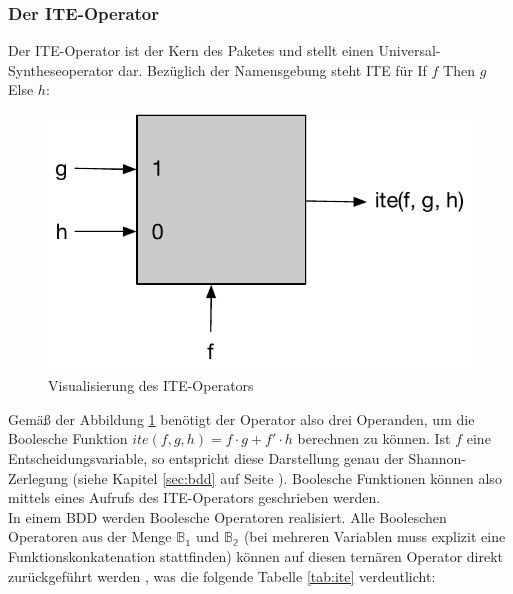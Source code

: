 \subsubsection{Der ITE-Operator}
\label{sec:ite}
Der ITE-Operator ist der Kern des Paketes und stellt einen Universal-Syntheseoperator dar. Bezüglich der Namensgebung steht ITE für \glqq If $f$ Then $g$ Else $h$\grqq{}:
\newpage
\begin{figure}[bth]
	\centering
	\includegraphics[scale=0.5]{./img/ite2}
	\caption[Visualisierung des ITE-Operators]{Visualisierung des ITE-Operators}
	\label{fig:iteo}
\end{figure}
\noindent
Gemäß der Abbildung \ref{fig:iteo} benötigt der Operator also drei Operanden, um die Boolesche Funktion $ite(f, g, h) = f \cdot g + f' \cdot h$ berechnen zu können. Ist $f$ eine Entscheidungsvariable, so entspricht diese Darstellung genau der Shannon-Zerlegung (siehe Kapitel \ref{sec:bdd} auf Seite \pageref{sec:bdd}). Boolesche Funktionen können also mittels eines Aufrufs des ITE-Operators geschrieben werden.\\
In einem BDD werden Boolesche Operatoren realisiert. Alle Booleschen Operatoren aus der Menge $\mathbb{B_1}$ und $\mathbb{B_2}$ (bei mehreren Variablen muss explizit eine Funktionskonkatenation stattfinden) können auf diesen ternären Operator direkt zurückgeführt werden \cite{cm1994}, was die folgende Tabelle \ref{tab:ite} verdeutlicht:
